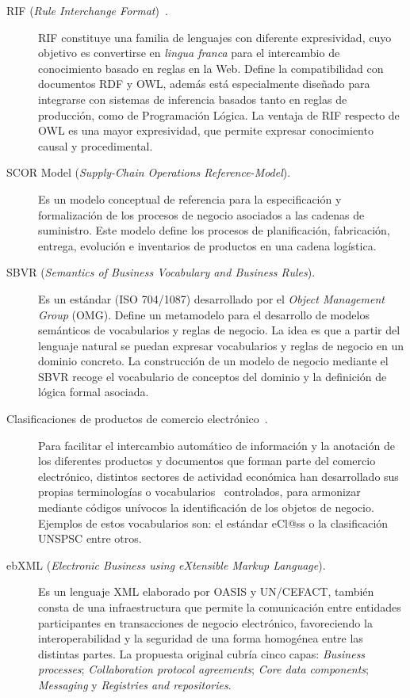 \begin{description}
\item[\gls{RIF} (\textit{Rule Interchange Format})~\cite{rif-core}.] RIF constituye una familia de lenguajes con diferente expresividad, 
cuyo objetivo es convertirse en \textit{lingua franca} para el intercambio de
conocimiento basado en reglas en la Web. Define la compatibilidad con
documentos RDF y OWL, además está especialmente diseñado para integrarse con
sistemas de inferencia basados tanto en reglas de producción, como de
Programación Lógica. La ventaja de RIF respecto de OWL es una mayor expresividad, 
que permite expresar conocimiento causal y procedimental. 


\item [\gls{SCOR} Model (\textit{Supply-Chain Operations Reference-Model}).] Es un modelo conceptual de
referencia para la especificación y formalización de los procesos de negocio
asociados a las cadenas de suministro. Este modelo define los procesos de
planificación, fabricación, entrega, evolución e inventarios de productos en una
cadena logística.

\item [\gls{SBVR} (\textit{Semantics of Business Vocabulary and Business Rules}).] Es un estándar
(ISO 704/1087) desarrollado por el \textit{Object Management Group} (\gls{OMG}). Define un
metamodelo para el desarrollo de modelos semánticos de vocabularios y reglas de
negocio. La idea es que a partir del lenguaje natural se puedan expresar
vocabularios y reglas de negocio en un dominio concreto. La construcción de un
modelo de negocio mediante el SBVR recoge el vocabulario de conceptos del
dominio y la definición de lógica formal asociada.

\item [Clasificaciones de productos de comercio electrónico~\cite{Leukel-ecatalog2005,Leukel-standard,Leukel-automating}.] Para
facilitar el intercambio automático de información y la anotación de los diferentes productos
y documentos que forman parte del comercio electrónico, distintos sectores de
actividad económica han desarrollado sus propias terminologías o
vocabularios~\cite{Norbert-class} controlados, para armonizar mediante códigos unívocos la identificación de
los objetos de negocio. Ejemplos de estos vocabularios son: el estándar eCl@ss o
la clasificación \gls{UNSPSC} entre otros.


\item [\gls{ebXML} (\textit{Electronic Business using eXtensible Markup Language}).] Es un lenguaje
\gls{XML} elaborado por \gls{OASIS} y UN/CEFACT, también consta de una infraestructura que permite la comunicación entre entidades
participantes en transacciones de negocio electrónico, favoreciendo la interoperabilidad y la seguridad de una forma homogénea entre las distintas partes.
La propuesta original cubría cinco capas: \textit{Business processes}; \textit{Collaboration protocol agreements};
\textit{Core data components}; \textit{Messaging} y \textit{Registries and repositories}.


\end{description}
